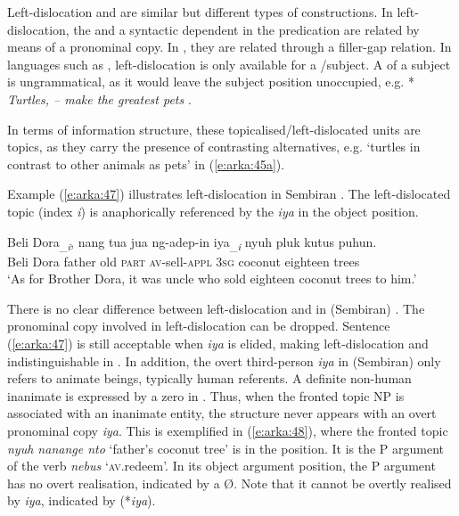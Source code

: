 \documentclass[output=paper
,modfonts
,nonflat]{langsci/langscibook}
\begin{document}
\noindent
Left-dislocation and  are similar but different types of constructions. In left-dislocation, the  and a syntactic dependent in the predication are related by means of a pronominal copy. In , they are related through a filler-gap relation. In languages such as , left-dislocation is only available for a /subject. A  of a subject is ungrammatical, as it would leave the subject position unoccupied, e.g. * \textit{Turtles, -- make the greatest pets} \citep{Foley2007info}. 

In terms of information structure, these topicalised/left-dislocated units are  topics, as they carry the presence of contrasting alternatives, e.g. ‘turtles in contrast to other animals as pets’ in (\ref{e:arka:45a}).

Example (\ref{e:arka:47}) illustrates left-dislocation in Sembiran . The left-dislocated topic (index \textit{i}) is anaphorically referenced by the  \textit{iya} in the object position. 

\begin{exe}
	\ex\label{e:arka:47}
	\gll {\ob}Beli Dora{\cb}\textsubscript{\_\textit{i}},   nang   tua   jua   ng-adep-in  iya\textsubscript{\_\textit{i}}  nyuh {pluk kutus}   puhun.\\
	\phantom{[}Beli Dora  father   old   \textsc{part}  \textsc{av}-sell-\textsc{appl}  3\textsc{sg}   coconut eighteen   trees\\
	\glt ‘As for Brother Dora, it was uncle who sold eighteen coconut trees to him.’
\end{exe}

\noindent
There is no clear difference between left-dislocation and  in (Sembiran) . The pronominal copy involved in left-dislocation can be dropped. Sentence (\ref{e:arka:47}) is still acceptable when \textit{iya} is elided, making left-dislocation and  indistinguishable in . In addition, the overt third-person  \textit{iya} in (Sembiran)  only refers to animate beings, typically human referents. A definite non-human inanimate  is expressed by a zero  in . Thus, when the fronted topic NP is associated with an inanimate entity, the structure never appears with an overt pronominal copy \textit{iya}.  This is exemplified in (\ref{e:arka:48}), where the fronted topic \textit{nyuh nanange nto} ‘father’s coconut tree’ is in the  position. It is the P argument of the verb \textit{nebus} ‘\textsc{av}.redeem’. In its object argument position, the P argument has no overt realisation, indicated by a Ø. Note that it cannot be overtly realised by \textit{iya}, indicated by (*\textit{iya}). 
\end{document}
